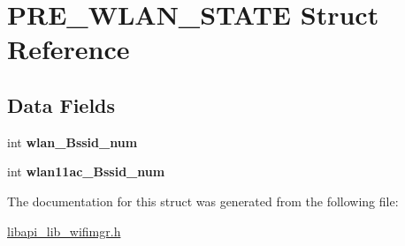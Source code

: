 \hypertarget{structPRE__WLAN__STATE}{}\section{P\+R\+E\+\_\+\+W\+L\+A\+N\+\_\+\+S\+T\+A\+TE Struct Reference}
\label{structPRE__WLAN__STATE}
\subsection*{Data Fields}
\begin{DoxyCompactItemize}
\item 
\mbox{\label{structPRE__WLAN__STATE_a1ceb00b5ed408c9d71fc209435871563}} 
int {\bfseries wlan\+\_\+\+Bssid\+\_\+num}
\item 
\mbox{\label{structPRE__WLAN__STATE_a2d342641cb102d545522c80221c2f189}} 
int {\bfseries wlan11ac\+\_\+\+Bssid\+\_\+num}
\end{DoxyCompactItemize}


The documentation for this struct was generated from the following file\+:\begin{DoxyCompactItemize}
\item 
\hyperlink{libapi__lib__wifimgr_8h}{libapi\+\_\+lib\+\_\+wifimgr.\+h}\end{DoxyCompactItemize}
